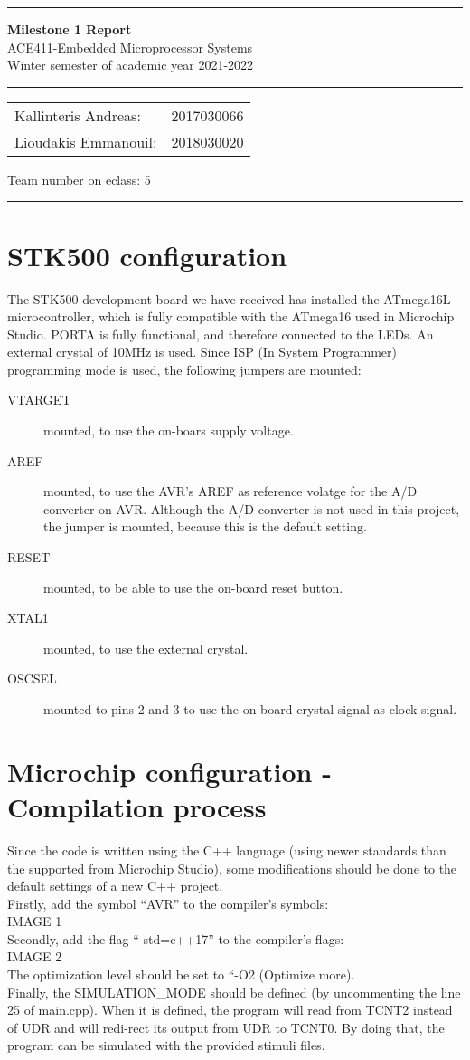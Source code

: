 \documentclass[12pt, a4]{article}
\begin{document}
\noindent \rule{\textwidth}{3pt}
\begin{center}
	{\bf \Large{Milestone 1 Report}}\\
	ACE411-Embedded Microprocessor Systems \\
	Winter semester of academic year 2021-2022
	\rule{\textwidth}{0.2mm} 
	\begin{tabular}{l r}
		Kallinteris Andreas:& 2017030066 \\ 
		Lioudakis Emmanouil:      &2018030020 
	\end{tabular} \vrule \hspace{3mm}
	\indent	Team number on eclass:  5
	\rule{\textwidth}{1pt}
\end{center}

\section*{STK500 configuration}
The STK500 development board we have received has installed the ATmega16L microcontroller, which is fully compatible with the ATmega16 used in Microchip Studio. PORTA is fully functional, and therefore connected to the LEDs. An external crystal of 10MHz is used. Since ISP (In System Programmer) programming mode is used, the following jumpers are mounted:
\begin{description}
\item[VTARGET] mounted, to use the on-boars supply voltage.
\item[AREF] mounted, to use the AVR's AREF as reference volatge for the A/D converter on AVR. Although the A/D converter is not used in this project, the jumper is mounted, because this is the default setting.
\item[RESET] mounted, to be able to use the on-board reset button.
\item[XTAL1] mounted, to use the external crystal.
\item[OSCSEL] mounted to pins 2 and 3 to use the on-board crystal signal as clock signal.
\end{description}

\section*{Microchip configuration - Compilation process}
Since the code is written using the C++ language (using newer standards than the supported from Microchip Studio), some modifications should be done to the default settings of a new C++ project.  \\
Firstly, add the symbol “AVR” to the compiler’s symbols:\\
IMAGE 1\\
Secondly, add the flag “-std=c++17” to the compiler’s flags:\\
IMAGE 2\\
The optimization level should be set to “-O2 (Optimize more).\\
Finally, the SIMULATION\_MODE should be defined (by uncommenting the line 25 of main.cpp). When it is defined, the program will read from TCNT2 instead of UDR and will redi-rect its output from UDR to TCNT0. By doing that, the program can be simulated with the provided stimuli files.
\end{document}
